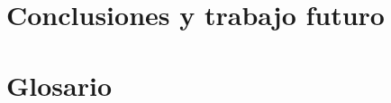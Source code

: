 \documentclass[12pt,a4paper,twoside]{book}
\begin{document}

\chapter{Conclusiones y trabajo futuro}

\chapter{Glosario}
\end{document}
